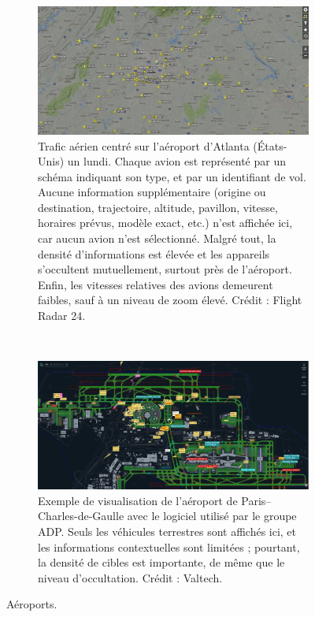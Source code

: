 	\begin{figure}[htbp]
		\begin{subfigure}{\textwidth}
			\centering
			\includegraphics[width=\textwidth]{figures/ch1/atlanta}
			\caption[Trafic aérien, Atlanta]{Trafic aérien centré sur l'aéroport d'Atlanta (États-Unis) un lundi. Chaque avion est représenté par un schéma indiquant son type, et par un identifiant de vol. Aucune information supplémentaire (origine ou destination, trajectoire, altitude, pavillon, vitesse, horaires prévus, modèle exact, etc.) n'est affichée ici, car aucun avion n'est sélectionné. Malgré tout, la densité d'informations est élevée et les appareils s'occultent mutuellement, surtout près de l'aéroport. Enfin, les vitesses relatives des avions demeurent faibles, sauf à un niveau de zoom élevé. Crédit : Flight Radar 24.}
			\label{fig:atlanta}
		\end{subfigure}
		~
		\begin{subfigure}{\textwidth}
			\centering
			\includegraphics[width=\textwidth]{figures/ch1/adp}
			\caption[ADP -- Roissy]{Exemple de visualisation de l'aéroport de Paris--Charles-de-Gaulle avec le logiciel utilisé par le groupe ADP. Seuls les véhicules terrestres sont affichés ici, et les informations contextuelles sont limitées ; pourtant, la densité de cibles est importante, de même que le niveau d'occultation. Crédit : Valtech.}
			\label{fig:adp}
		\end{subfigure}
		\caption[Aéroports]{Aéroports.}
		\label{fig:airports}
	\end{figure}
	
